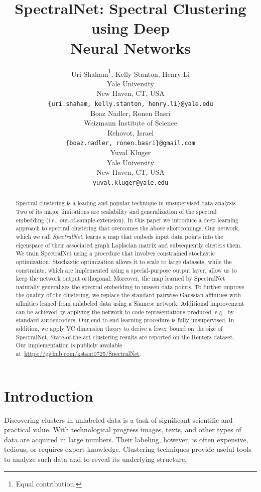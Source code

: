 \documentclass{article} %
\title{SpectralNet: Spectral Clustering using Deep\\ Neural Networks}
\author{Uri Shaham\thanks{Equal contribution.}, Kelly Stanton\samethanks[1], Henry Li\samethanks[1] \\
Yale University\\
New Haven, CT, USA \\
\texttt{\{uri.shaham, kelly.stanton, henry.li\}@yale.edu} \\
\AND
Boaz Nadler, Ronen Basri \\
Weizmann Institute of Science\\
Rehovot, Israel \\
\texttt{\{boaz.nadler, ronen.basri\}@gmail.com} \\
\And
Yuval Kluger \\
Yale University\\
New Haven, CT, USA \\
\texttt{yuval.kluger@yale.edu} \\
}
\begin{document}
\maketitle

\begin{abstract}
Spectral clustering is a leading and popular technique in unsupervised data analysis.
Two of its major limitations are scalability and generalization of the spectral embedding (i.e., out-of-sample-extension).
In this paper we introduce a deep learning approach to spectral clustering that overcomes the above shortcomings.
Our network, which we call \textit{SpectralNet}, learns a map that embeds input data points into the eigenspace of their associated graph Laplacian matrix and subsequently clusters them. We train SpectralNet using a procedure that involves constrained stochastic optimization. Stochastic optimization allows it to scale to large datasets, while the constraints, which are implemented using a special-purpose output layer, allow us to keep the network output orthogonal. Moreover, the map learned by SpectralNet naturally generalizes the spectral embedding to unseen data points.
To further improve the quality of the clustering, we replace the standard pairwise Gaussian affinities with affinities leaned from unlabeled data using a Siamese network.
Additional improvement can be achieved by applying the network to code representations produced, e.g., by standard autoencoders. Our end-to-end learning procedure is fully unsupervised.
In addition, we apply VC dimension theory to derive a lower bound on the size of  SpectralNet.
State-of-the-art clustering results are reported on the Reuters dataset.
Our implementation is publicly available at~\url{https://github.com/kstant0725/SpectralNet}.
\end{abstract}


\section {Introduction}

Discovering clusters in unlabeled data is a task of significant scientific and practical value. With technological progress images, texts, and other types of data are acquired in large numbers. Their labeling, however, is often expensive, tedious, or requires expert knowledge. Clustering techniques provide useful tools to analyze such data and to reveal its underlying structure.
\end{document}
